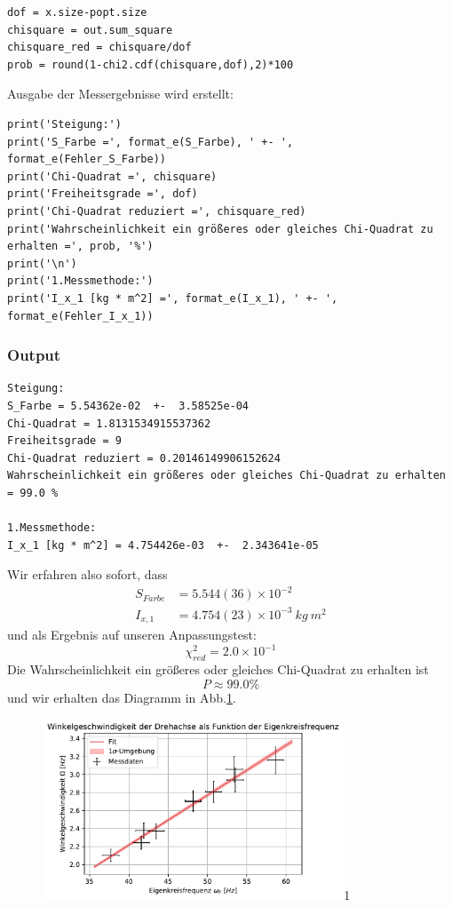 \documentclass[a4paper,10pt]{article}
\begin{document}
\begin{lstlisting}
dof = x.size-popt.size
chisquare = out.sum_square
chisquare_red = chisquare/dof
prob = round(1-chi2.cdf(chisquare,dof),2)*100

\end{lstlisting}

Ausgabe der Messergebnisse wird erstellt:\begin{lstlisting}
print('Steigung:')
print('S_Farbe =', format_e(S_Farbe), ' +- ', format_e(Fehler_S_Farbe))
print('Chi-Quadrat =', chisquare)
print('Freiheitsgrade =', dof)
print('Chi-Quadrat reduziert =', chisquare_red)
print('Wahrscheinlichkeit ein größeres oder gleiches Chi-Quadrat zu erhalten =', prob, '%')
print('\n')
print('1.Messmethode:')
print('I_x_1 [kg * m^2] =', format_e(I_x_1), ' +- ', format_e(Fehler_I_x_1))
\end{lstlisting}

\subsubsection{Output}
\begin{lstlisting}
Steigung:
S_Farbe = 5.54362e-02  +-  3.58525e-04
Chi-Quadrat = 1.8131534915537362
Freiheitsgrade = 9
Chi-Quadrat reduziert = 0.20146149906152624
Wahrscheinlichkeit ein größeres oder gleiches Chi-Quadrat zu erhalten = 99.0 %

1.Messmethode:
I_x_1 [kg * m^2] = 4.754426e-03  +-  2.343641e-05
\end{lstlisting}
Wir erfahren also sofort, dass
\begin{align*}
S_{Farbe}&=5.544(36)\times10^{-2}\\
I_{x,1}&=4.754(23)\times10^{-3}\:kg\: m^2
\end{align*}
und als Ergebnis auf unseren Anpassungstest:
\[\chi^{2}_{red}=2.0\times10^{-1}\]
Die Wahrscheinlichkeit ein größeres oder gleiches Chi-Quadrat zu erhalten ist
 \[P\approx  99.0 \%\]
und wir erhalten das Diagramm in Abb.\ref{fig:Fig4}.
\begin{figure}[htb]
  \centering
  \begin{annotate}{\includegraphics[width=0.8\textwidth]{213_Fig4.pdf}}{1}
  \end{annotate}
\caption{}
\label{fig:Fig4}
\end{figure}
\end{document}
